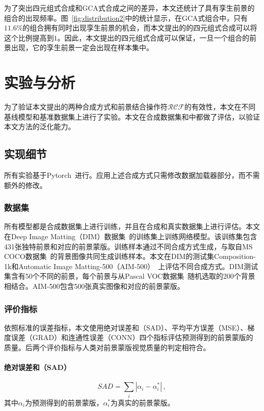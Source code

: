\documentclass[supercite]{HustGraduPaper}
\begin{document}
	为了突出四元组式合成和GCA式合成之间的差异，本文还统计了具有孪生前景的组合的出现频率。图~\ref{fig:distribution2}中的统计显示，在GCA式组合中，只有$11.6\%$的组合拥有同时出现孪生前景的机会，而本文提出的的四元组式合成可以将这个比例提高到$1$。因此，本文提出的四元组式合成可以保证，一旦一个组合的前景出现，它的孪生前景一定会出现在样本集中。




	


	\section{实验与分析}
	为了验证本文提出的两种合成方式和前景结合操作符$\mathcal{RCF}$的有效性，本文在不同基线模型和基准数据集上进行了实验。本文在合成数据集和中都做了评估，以验证本文方法的泛化能力。
	
	\subsection{实现细节}
	所有实验基于Pytorch~\cite{paszke2019pytorch}进行。应用上述合成方式只需修改数据加载器部分，而不需额外的修改。

	\subsubsection{数据集}
	所有模型都是合成数据集上进行训练，并且在合成和真实数据集上进行评估。本文在Deep Image Matting（DIM）数据集~\cite{DIM}的训练集上训练网络模型。该训练集包含431张独特前景和对应的前景蒙版。训练样本通过不同合成方式生成，与取自MS COCO数据集~\cite{COCO}的背景图像共同生成训练样本。本文在DIM的测试集Composition-1k和Automatic Image Matting-500（AIM-500）~\cite{AIM}上评估不同合成方式。DIM测试集含有50个不同的前景，每个前景与从Pascal VOC数据集~\cite{VOC}随机选取的200个背景相结合。AIM-500包含500张真实图像和对应的前景蒙版。
	
	\subsubsection{评价指标}
	依照标准的误差指标\cite{metrics}，本文使用绝对误差和（SAD）、平均平方误差（MSE）、梯度误差（GRAD）和连通性误差（CONN）四个指标评估预测得到的前景蒙版的质量。后两个评价指标与人类对前景蒙版视觉质量的判定相符合。
	\paragraph{绝对误差和（SAD）}
	\begin{equation}
		SAD=\sum\limits_i\left|\alpha_i-\alpha_i^*\right|\,,
	\end{equation}
	其中$\alpha_i$为预测得到的前景蒙版，$\alpha_i^*$为真实的前景蒙版。
\end{document}

